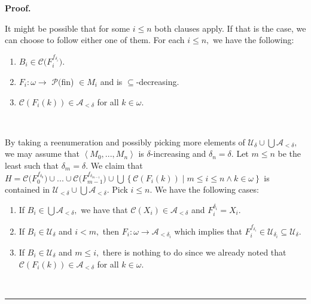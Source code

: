 \documentclass{article}%
\newenvironment{proof}[1][Proof]{\noindent\textbf{#1.} }{\ \rule{0.5em}{0.5em}}
\begin{document}
\begin{proof}
\qquad\ \ 

It might be possible that for some $i\leq n$ both clauses apply. If that is
the case, we can choose to follow either one of them. For each $i\leq n,$ we
have the following:

\begin{enumerate}
\item $B_{i}\in\mathcal{C(}F_{i}^{f_{\delta_{i}}}).$

\item $F_{i}:\omega\longrightarrow$ $\mathcal{P(}$\textsf{fin) }$\in M_{i}$
and is $\subseteq$-decreasing$.$

\item $\mathcal{C}\left(  F_{i}\left(  k\right)  \right)  \in\mathcal{A}%
_{<\delta}$ for all $k\in\omega.$
\end{enumerate}

\qquad\ \ 

By taking a reenumeration and possibly picking more elements of $\mathcal{U}%
_{\delta}\cup%
{\textstyle\bigcup}
\mathcal{A}_{<\delta},$ we may assume that $\left\langle M_{0},...,M_{n}%
\right\rangle $ is $\delta$-increasing and $\delta_{n}=\delta.$ Let $m\leq n$
be the least such that $\delta_{m}=\delta.$ We claim that $H=\mathcal{C(}%
F_{0}^{f_{\delta_{0}}})\cup...\cup\mathcal{C(}F_{m-1}^{f_{\delta_{m-1}}})\cup%
{\textstyle\bigcup}
\left\{  \mathcal{C}\left(  F_{i}\left(  k\right)  \right)  \mid m\leq i\leq
n\wedge k\in\omega\right\}  $ is contained in $\mathcal{U}_{<\delta}\cup%
{\textstyle\bigcup}
\mathcal{A}_{<\delta}.$ Pick $i\leq n.$ We have the following cases:

\begin{enumerate}
\item If $B_{i}\in%
{\textstyle\bigcup}
\mathcal{A}_{<\delta},$ we have that $\mathcal{C}\left(  X_{i}\right)
\in\mathcal{A}_{<\delta}$ and $F_{i}^{\delta_{i}}=X_{i}$.

\item If $B_{i}\in\mathcal{U}_{\delta}$ and $i<m,$ then $F_{i}:\omega
\longrightarrow\mathcal{A}_{<\delta_{i}}$ which implies that $F_{i}%
^{f_{\delta_{i}}}\in\mathcal{U}_{\delta_{i}}\subseteq\mathcal{U}_{\delta}.$

\item If $B_{i}\in\mathcal{U}_{\delta}$ and $m\leq i,$ there is nothing to do
since we already noted that $\mathcal{C}\left(  F_{i}\left(  k\right)
\right)  \in\mathcal{A}_{<\delta}$ for all $k\in\omega.$
\end{enumerate}


\end{proof}
\end{document}
